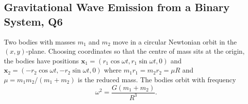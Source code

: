 \subsection{Gravitational Wave Emission from a Binary System, Q6}

Two bodies with masses $m_1$ and $m_2$ move in a circular Newtonian orbit in the $(x,y)$-plane. Choosing coordinates so that the centre of mass sits at the origin, the bodies have positions $\mathbf{x}_1 = (r_1\cos\omega t, r_1\sin\omega t, 0)$ and $\mathbf{x}_2 = (-r_2\cos\omega t, -r_2\sin\omega t, 0)$ where $m_1 r_1 = m_2 r_2 = \mu R$ and $\mu = m_1 m_2/(m_1+m_2)$ is the reduced mass. The bodies orbit with frequency
\begin{equation}
    \omega^2 = \frac{G(m_1+m_2)}{R^3}.
\end{equation}

